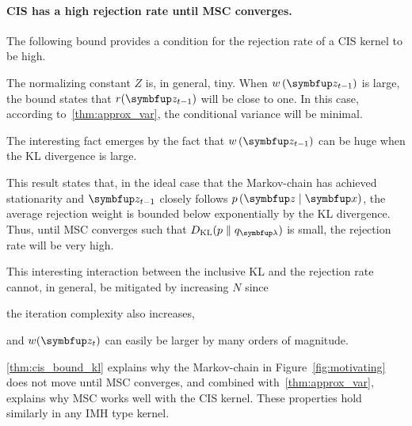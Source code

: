 \vspace{-0.1in}
\paragraph{CIS has a high rejection rate until MSC converges.}
The following bound provides a condition for the rejection rate of a CIS kernel to be high.
%

%
The normalizing constant \(Z\) is, in general, tiny.
When \(w\,(\vz_{t-1})\) is large, the bound states that \(r(\vz_{t-1})\) will be close to one.
In this case, according to~\cref{thm:approx_var}, the conditional variance will be minimal.

The interesting fact emerges by the fact that \(w\,(\vz_{t-1})\) can be huge when the KL divergence is large.
%

%
This result states that, in the ideal case that the Markov-chain has achieved stationarity and \(\vz_{t-1}\) closely follows \(p\,(\vz\mid\vx)\), the average rejection weight is bounded below exponentially by the KL divergence.
Thus, until MSC converges such that \(\DKL{p}{q_{\vlambda}}\) is small, the rejection rate will be very high.

This interesting interaction between the inclusive KL and the rejection rate cannot, in general, be mitigated by increasing \(N\) since
\begin{enumerate*}[label=(\roman*)]
  \item the iteration complexity also increases,
  \item and \(w(\vz_t)\) can easily be larger by many orders of magnitude.
\end{enumerate*}
\cref{thm:cis_bound_kl} explains why the Markov-chain in Figure~\ref{fig:motivating} does not move until MSC converges, and combined with~\cref{thm:approx_var}, explains why MSC works well with the CIS kernel.
These properties hold similarly in any IMH type kernel.

\vspace{-0.1in}
